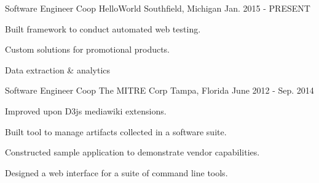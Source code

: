 

\begin{cventries}



  \cventry
    {Software Engineer Coop} %
    {HelloWorld} %
    {Southfield, Michigan} %
    {Jan. 2015 - PRESENT} %
    {
      \begin{cvitems} %
        \item {Built framework to conduct automated web testing.}
        \item {Custom solutions for promotional products.}
        \item {Data extraction \& analytics}
      \end{cvitems}
    }

  \cventry
    {Software Engineer Coop} %
    {The MITRE Corp} %
    {Tampa, Florida} %
    {June 2012 - Sep. 2014} %
    {
      \begin{cvitems} %
        \item {Improved upon D3js mediawiki extensions.}
        \item {Built tool to manage artifacts collected in a software suite.}
        \item {Constructed sample application to demonstrate vendor capabilities.}
        \item {Designed a web interface for a suite of command line tools.}
      \end{cvitems}
    }

\end{cventries}
